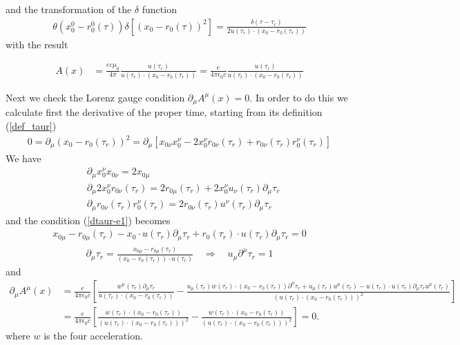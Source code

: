 and the transformation of the $\delta$ function
\begin{align}
    \theta(x_0^0-r_0^0(\tau))\delta[(x_0-r_0(\tau))^2]=\frac{\delta(\tau-\tau_r)}{2u(\tau_r)\cdot(x_0-r_0(\tau_r))}
\end{align}
with the result
\begin{importantbox}
    \begin{align}
        A(x) & =\frac{ec\mu_0}{4\pi}\frac{u(\tau_r)}{u(\tau_r)\cdot(x_0-r_0(\tau_r))}=\frac{e}{4\pi\epsilon_0c}\frac{u(\tau_r)}{u(\tau_r)\cdot(x_0-r_0(\tau_r))}\label{A_mu_cov}
    \end{align}
\end{importantbox}

Next we check the Lorenz gauge condition $\partial_{\mu}A^{\mu}(x)=0$. In order to do this we calculate first the derivative of the proper time, starting from its definition (\ref{def_taur})
\begin{align}
    0=\partial_{\mu}(x_0-r_0(\tau_r))^2=\partial_{\mu}\left[x_{0\nu}x_0^{\nu}-2x_0^{\nu}r_{0\nu}(\tau_r)+r_{0\nu}(\tau_r)r_0^{\nu}(\tau_r)\right]\label{dtaur-e1}
\end{align}
We have
\begin{align}
     & \partial_{\mu}x_0^{\nu}x_{0\nu}=2x_{0\mu}                                                                \\
     & \partial_{\mu}2x_0^{\nu}r_{0\nu}(\tau_r)=2r_{0\mu}(\tau_r)+2x_0^{\nu}u_{\nu}(\tau_r)\partial_{\mu}\tau_r \\
     & \partial_{\mu}r_{0\nu}(\tau_r)r_0^{\nu}(\tau_r)=2r_{0\nu}(\tau_r)u^{\nu}(\tau_r)\partial_{\mu}\tau_r
\end{align}
and the condition (\ref{dtaur-e1}) becomes
\begin{align}
    x_{0\mu}-r_{0\mu}(\tau_r)-x_0\cdot u(\tau_r)\partial_{\mu}\tau_r+r_0(\tau_r)\cdot u(\tau_r)\partial_{\mu}\tau_r=0
\end{align}
\begin{align}
    \partial_{\mu}\tau_r=\frac{x_{0\mu}-r_{0\mu}(\tau_r)}{(x_0-r_0(\tau_r))\cdot u(\tau_r)}\quad\Rightarrow\quad u_{\mu}\partial^{\mu}\tau_r=1
\end{align}
and
\begin{align}
    \partial_{\mu}A^{\mu}(x) & =\frac{e}{4\pi\epsilon_0c}\left[\frac{w^{\mu}(\tau_r)\partial_{\mu}\tau_r}{u(\tau_r)\cdot(x_0-r_0(\tau_r))}-\frac{u_{\mu}(\tau_r)w(\tau_r)\cdot(x_0-r_0(\tau_r))\partial^{\mu}\tau_r+u_{\mu}(\tau_r)u^{\mu}(\tau_r)-u(\tau_r)\cdot u(\tau_r)\partial_{\mu}\tau_ru^{\mu}(\tau_r)}{(u(\tau_r)\cdot(x_0-r_0(\tau_r)))^2}\right]\nonumber \\
                             & =\frac{e}{4\pi\epsilon_0c}\left[\frac{w(\tau_r)\cdot(x_0-r_0(\tau_r))}{(u(\tau_r)\cdot(x_0-r_0(\tau_r)))^2}-\frac{w(\tau_r)\cdot(x_0-r_0(\tau_r))}{(u(\tau_r)\cdot(x_0-r_0(\tau_r)))^2}\right]=0.\label{lorenzzemitted}
\end{align}
where $w$ is the four acceleration.


